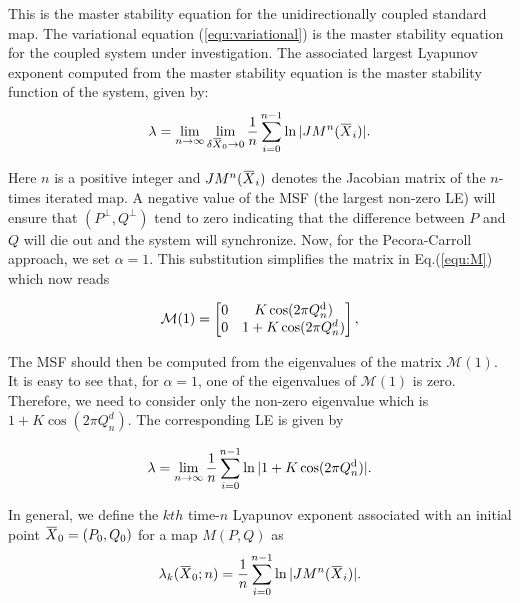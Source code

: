 \documentclass[reprint,amsmath,amssymb,aps,pre]{revtex4-1}
\newcommand{\overbar}[1]{\mkern 1.5mu\overline{\mkern-1.5mu#1\mkern-1.5mu}\mkern 1.5mu}
\begin{document}
This is the master stability equation for the unidirectionally coupled 
standard map. The variational equation (\ref{equ:variational}) is the master 
stability equation for the coupled system under investigation. The associated 
largest Lyapunov exponent computed from the master stability equation is the 
master stability function of the system, given by:
\begin{equation}
\label{equ:msf}
\lambda  = \lim_{n \rightarrow \infty} \lim_{\delta\overbar{X}_0\rightarrow 
0}\frac{1}{n}\sum^{n-1}_{i=0}\ln|JM^n(\overbar{X}_i)|.
\end{equation}

Here $n$ is a positive integer and $JM^n(\overbar{X}_i)$ denotes the Jacobian matrix of the $n$-times iterated map.  A negative value of the MSF (the largest non-zero LE) will ensure that $(P^\perp,Q^\perp) $ tend to zero indicating that the difference between $P$ and $Q$ will die out and the system will synchronize. 
Now, for the Pecora-Carroll approach, we set $\alpha = 1$. This substitution simplifies the matrix in Eq.(\ref{equ:M}) which now reads

\begin{equation} 
\mathcal{M}(1)= \begin{bmatrix} 0 & K\cos(2\pi Q^\textnormal{d}_n) \\ 0 & 1 + K\cos(2\pi 
Q^d_n) \end{bmatrix},
\end{equation}

The MSF should then be computed from the eigenvalues of the matrix $\mathcal{M}(1)$. It is easy to see that, for $\alpha =1$, one of the eigenvalues of   $\mathcal{M}(1)$ is zero. Therefore, we need to consider only the non-zero eigenvalue which is $1+K\cos(2\pi Q^d_n)$. The corresponding LE is given by

\begin{equation}
\label{equ:LE}
\lambda   = \lim_{n \rightarrow \infty} 
\frac{1}{n}\sum^{n-1}_{i=0}\ln|1+K\cos(2\pi Q^\textnormal{d}_n)|.
\end{equation}

In general, we define the $kth$ time-$n$ Lyapunov exponent associated with an initial point $\overbar{X}_0 = (P_0,Q_0)$ for a map $M(P,Q)$ as
\begin{equation}
\label{equ:FLEf}
\lambda _k(\overbar{X}_0;n)  = 
\frac{1}{n}\sum^{n-1}_{i=0}\ln|JM^n(\overbar{X}_i)|.
\end{equation}
\end{document}
